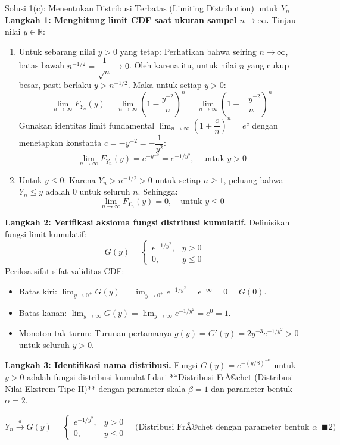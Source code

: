 \documentclass[10pt,twoside]{article}
\begin{document}
\begin{solbox}{Solusi 1(c): Menentukan Distribusi Terbatas (Limiting Distribution) untuk $Y_n$}
\textbf{Langkah 1: Menghitung limit CDF saat ukuran sampel $n \to \infty$.}
Tinjau nilai $y \in \mathbb{R}$:
\begin{enumerate}[label=\arabic*.]
  \item Untuk sebarang nilai $y > 0$ yang tetap:
  Perhatikan bahwa seiring $n \to \infty$, batas bawah $n^{-1/2} = \dfrac{1}{\sqrt{n}} \to 0$.
  Oleh karena itu, untuk nilai $n$ yang cukup besar, pasti berlaku $y > n^{-1/2}$.
  Maka untuk setiap $y > 0$:
  \[
  \lim_{n \to \infty} F_{Y_n}(y) = \lim_{n \to \infty} \left(1 - \frac{y^{-2}}{n}\right)^n = \lim_{n \to \infty} \left(1 + \frac{-y^{-2}}{n}\right)^n
  \]
  Gunakan identitas limit fundamental $\lim_{n \to \infty} \left(1 + \dfrac{c}{n}\right)^n = e^c$ dengan menetapkan konstanta $c = -y^{-2} = -\dfrac{1}{y^2}$:
  \[
  \lim_{n \to \infty} F_{Y_n}(y) = e^{-y^{-2}} = e^{-1/y^2}, \quad \text{untuk } y > 0
  \]
  \item Untuk $y \le 0$:
  Karena $Y_n > n^{-1/2} > 0$ untuk setiap $n \ge 1$, peluang bahwa $Y_n \le y$ adalah 0 untuk seluruh $n$. Sehingga:
  \[
  \lim_{n \to \infty} F_{Y_n}(y) = 0, \quad \text{untuk } y \le 0
  \]
\end{enumerate}

\textbf{Langkah 2: Verifikasi aksioma fungsi distribusi kumulatif.}
Definisikan fungsi limit kumulatif:
\[
G(y) = \begin{cases} e^{-1/y^2}, & y > 0 \\ 0, & y \le 0 \end{cases}
\]
Periksa sifat-sifat validitas CDF:
\begin{itemize}
  \item Batas kiri: $\lim_{y \to 0^+} G(y) = \lim_{y \to 0^+} e^{-1/y^2} = e^{-\infty} = 0 = G(0)$.
  \item Batas kanan: $\lim_{y \to \infty} G(y) = \lim_{y \to \infty} e^{-1/y^2} = e^0 = 1$.
  \item Monoton tak-turun: Turunan pertamanya $g(y) = G'(y) = 2y^{-3} e^{-1/y^2} > 0$ untuk seluruh $y > 0$.
\end{itemize}

\textbf{Langkah 3: Identifikasi nama distribusi.}
Fungsi $G(y) = e^{-(y/\beta)^{-\alpha}}$ untuk $y > 0$ adalah fungsi distribusi kumulatif dari **Distribusi FrÃ©chet (Distribusi Nilai Ekstrem Tipe II)** dengan parameter skala $\beta = 1$ dan parameter bentuk $\alpha = 2$.

\[
\boxed{Y_n \xrightarrow{d} G(y) = \begin{cases} e^{-1/y^2}, & y > 0 \\ 0, & y \le 0 \end{cases} \quad \text{(Distribusi FrÃ©chet dengan parameter bentuk } \alpha = 2\text{)}} \qquad \blacksquare
\]
\end{solbox}
\end{document}

